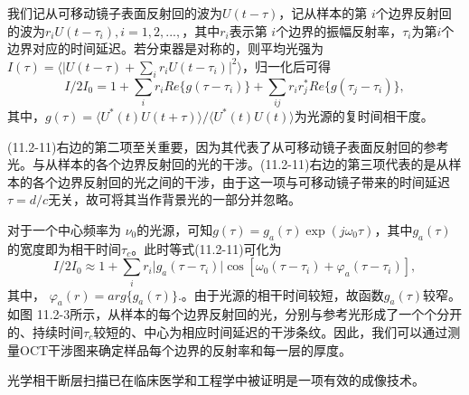 \documentclass[UTF8]{ctexart}
\numberwithin{figure}{subsection}
\numberwithin{table}{subsection}
\begin{document}
\par 我们记从可移动镜子表面反射回的波为$U(t - \tau) $，记从样本的第 $i$个边界反射回的波为$ r_i U(t - \tau_i), i = 1, 2, ..., $，其中$ r_i $表示第 $i$个边界的振幅反射率，$\tau_i $为第$i$个边界对应的时间延迟。若分束器是对称的，则平均光强为$ I(\tau) = \langle \lvert U(t - \tau) + \sum_i r_i U(t - \tau_i) \rvert ^2 \rangle $，归一化后可得
\begin{equation}
I / 2I_0 = 1 + \sum_i r_i Re\{g(\tau - \tau_i)\} + \sum_{ij} r_i r_j^\ast Re\{g(\tau_j - \tau_i)\} ,
\end{equation}
其中，$ g(\tau) = \langle U^\ast (t) U(t + \tau)\rangle / \langle U^\ast (t) U(t) \rangle $为光源的复时间相干度。
\par (11.2-11)右边的第二项至关重要，因为其代表了从可移动镜子表面反射回的参考光。与从样本的各个边界反射回的光的干涉。(11.2-11)右边的第三项代表的是从样本的各个边界反射回的光之间的干涉，由于这一项与可移动镜子带来的时间延迟 $ \tau = d / c $无关，故可将其当作背景光的一部分并忽略。
\par 对于一个中心频率为 $ \nu_0 $的光源，可知$ g(\tau) = g_a (\tau) \exp(j\omega_0 \tau) $，其中$ g_a (\tau) $ 的宽度即为相干时间$ \tau_c $。此时等式(11.2-11)可化为
\begin{equation}
I / 2I_0 \approx 1 + \sum_i r_i \lvert g_a (\tau - \tau_i) \rvert \cos [\omega_0 (\tau - \tau_i) + \varphi_a (\tau - \tau_i)] ,
\end{equation}
其中， $ \varphi_a (r) = arg\{g_a ( \tau )\} $.。由于光源的相干时间较短，故函数$ g_a (\tau) $较窄。如图 11.2-3所示，从样本的每个边界反射回的光，分别与参考光形成了一个个分开的、持续时间$ \tau_c $较短的、中心为相应时间延迟的干涉条纹。因此，我们可以通过测量OCT干涉图来确定样品每个边界的反射率和每一层的厚度。
\par 光学相干断层扫描已在临床医学和工程学中被证明是一项有效的成像技术。
\bigbreak\begingroup
\color{ksc}
\end{document}

